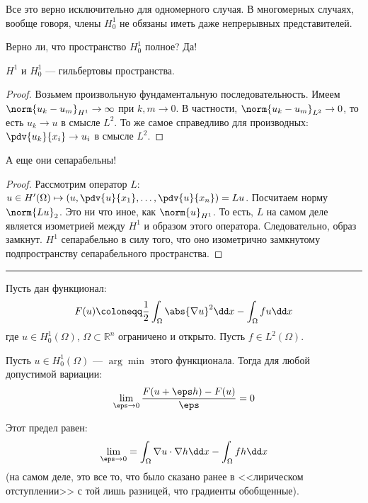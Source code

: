 Все это верно исключительно для одномерного случая. В многомерных случаях, вообще говоря, члены $H_0^1$ не обязаны иметь даже непрерывных представителей.
\bigskip

Верно ли, что пространство $H_0^1$ полное? Да!
\begin{thm}
  $H^1$ и $H_0^1$ --- гильбертовы пространства.
\end{thm}

\begin{proof}
  Возьмем произвольную фундаментальную последовательность. Имеем $\norm{u_k - u_m}_{H^1} \to \infty$ при $k, m \to 0$. В частности, $\norm{u_k - u_m}_{L^2} \to 0$, то есть $u_k \to u$ в смысле $L^2$. То же самое справедливо для производных: $\pdv{u_k}{x_i} \to u_i$ в смысле $L^2$.
\end{proof}

\begin{thm}
А еще они сепарабельны!
\end{thm}

\begin{proof}
Рассмотрим оператор $L$: $u \in H'(\Omega) \mapsto (u, \pdv{u}{x_1}, \ldots, \pdv{u}{x_n}) = Lu$. Посчитаем норму $\norm{Lu}_2$. Это ни что иное, как $\norm{u}_{H^1}$. То есть, $L$ на самом деле является изометрией между $H^1$ и образом этого оператора. Следовательно, образ замкнут. $H^1$ сепарабельно в силу того, что оно изометрично замкнутому подпространству сепарабельного пространства.
\end{proof}

\bigskip
\hrule
\bigskip

Пусть дан функционал:
\begin{equation}
  F(u) \coloneqq \frac{1}{2} \int_\Omega \abs{\nabla u}^2 \dd x - \int_\Omega f u \dd x \label{func2}
\end{equation}
%
где $u \in H_0^1(\Omega)$, $\Omega \subset \mathbb{R}^n$ ограничено и открыто. Пусть $f \in L^2(\Omega)$.

Пусть $u \in H_0^1(\Omega)$ --- $\arg \min$ этого функционала. Тогда для любой допустимой вариации:
\begin{equation}
  \lim_{\eps \to 0} \frac{F(u + \eps h) - F(u)}{\eps} = 0
\end{equation}

Этот предел равен:
\begin{equation}
  \lim_{\eps \to 0} = \int_\Omega \nabla u \cdot \nabla h \dd x - \int_\Omega f h \dd x
\end{equation}
%
(на самом деле, это все то, что было сказано ранее в <<лирическом отступлении>> с той лишь разницей, что градиенты обобщенные).

